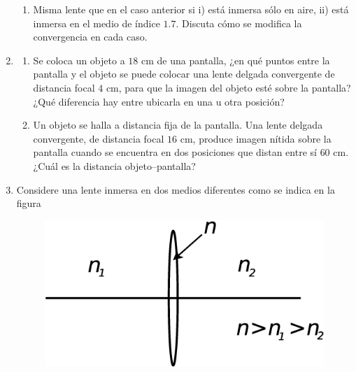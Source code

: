 \documentclass[11pt,spanish]{article}
\begin{document}
\begin{enumerate}
\begin{enumerate}
        \item Misma lente que en el caso anterior si i) está inmersa sólo en
        aire, ii) está inmersa en el medio de índice $1.7$. Discuta cómo se
        modifica la convergencia en cada caso.
    \end{enumerate}


    \item
    \begin{enumerate}

        \item Se coloca un objeto a $18$ cm de una pantalla, ¿en qué puntos
        entre la pantalla y el objeto se puede colocar una lente delgada
        convergente de distancia focal $4$ cm, para que la imagen del objeto
        esté sobre la pantalla? ¿Qué diferencia hay entre ubicarla en una u otra
        posición?
        
        \item Un objeto se halla a distancia fija de la pantalla. Una lente
        delgada convergente, de distancia focal $16$ cm, produce imagen nítida
        sobre la pantalla cuando se encuentra en dos posiciones que distan entre
        sí $60$ cm. ¿Cuál es la distancia objeto--pantalla?
    \end{enumerate}


    \item Considere una lente inmersa en dos medios diferentes como se indica en
    la figura
    
    \begin{figure}[H]
        \centering{}\includegraphics[clip,scale=0.25]{figs/ej3-25}
    \end{figure}
    
    \begin{enumerate}
    

\end{enumerate}
\end{enumerate}
\end{document}
